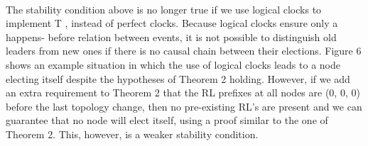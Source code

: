 \paragraph{}The stability condition above is no longer true if we use logical clocks to implement T , instead of perfect clocks. Because logical clocks ensure only a happens- before relation between events, it is not possible to distinguish old leaders from new ones if there is no causal chain between their elections. Figure 6 shows an example situation in which the use of logical clocks leads to a node electing itself despite the hypotheses of Theorem 2 holding. However, if we add an extra requirement to Theorem 2 that the RL prefixes at all nodes are (0, 0, 0) before the last topology change, then no pre-existing RL’s are present and we can guarantee that no node will elect itself, using a proof similar to the one of Theorem 2. This, however, is a weaker stability condition.